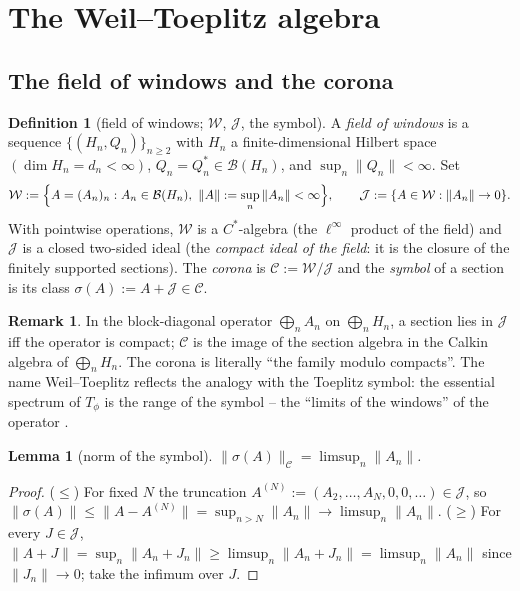 \documentclass[11pt,reqno]{amsart}
\newtheorem{lemma}[theorem]{Lemma}
\theoremstyle{definition}
\newtheorem{definition}[theorem]{Definition}
\newtheorem{remark}[theorem]{Remark}
\newcommand{\W}{\mathcal{W}}
\newcommand{\Jc}{\mathcal{J}}
\newcommand{\Cor}{\mathcal{C}}
\begin{document}
\section{The Weil--Toeplitz algebra}\label{sec:algebra}

\subsection{The field of windows and the corona}

\begin{definition}[field of windows; \(\W\), \(\Jc\), the symbol]\label{def:field}
A \emph{field of windows} is a sequence
\(\{(H_n,Q_n)\}_{n\geq2}\) with \(H_n\) a finite-dimensional Hilbert space
\((\dim H_n=d_n<\infty)\), \(Q_n=Q_n^*\in\mathcal B(H_n)\), and
\(\sup_n\|Q_n\|<\infty\). Set
\[
\W:=\Bigl\{A=(A_n)_n:A_n\in\mathcal B(H_n),\ \|A\|:=\sup_n\|A_n\|<\infty\Bigr\},
\qquad
\Jc:=\{A\in\W:\|A_n\|\to0\}.
\]
With pointwise operations, \(\W\) is a \(C^*\)-algebra (the \(\ell^\infty\)
product of the field) and \(\Jc\) is a closed two-sided ideal (the
\emph{compact ideal of the field}: it is the closure of the finitely supported
sections). The \emph{corona} is \(\Cor:=\W/\Jc\) and the \emph{symbol} of a
section is its class \(\sigma(A):=A+\Jc\in\Cor\).
\end{definition}

\begin{remark}
In the block-diagonal operator \(\bigoplus_n A_n\) on \(\bigoplus_n H_n\), a
section lies in \(\Jc\) iff the operator is compact; \(\Cor\) is the image of
the section algebra in the Calkin algebra of \(\bigoplus_n H_n\). The corona is
literally ``the family modulo compacts''. The name Weil--Toeplitz reflects the
analogy with the Toeplitz symbol: the essential spectrum of \(T_\phi\) is the
range of the symbol -- the ``limits of the windows'' of the operator
\cite{BottcherSilbermann,RabinovichRochSilbermann}.
\end{remark}

\begin{lemma}[norm of the symbol]\label{lem:symbol-norm}
\(\|\sigma(A)\|_{\Cor}=\limsup_n\|A_n\|\).
\end{lemma}

\begin{proof}
(\(\leq\)) For fixed \(N\) the truncation
\(A^{(N)}:=(A_2,\dots,A_N,0,0,\dots)\in\Jc\), so
\(\|\sigma(A)\|\leq\|A-A^{(N)}\|=\sup_{n>N}\|A_n\|\to\limsup_n\|A_n\|\). (\(\geq\))
For every \(J\in\Jc\),
\(\|A+J\|=\sup_n\|A_n+J_n\|\geq\limsup_n\|A_n+J_n\|=\limsup_n\|A_n\|\) since
\(\|J_n\|\to0\); take the infimum over \(J\).
\end{proof}
\end{document}
